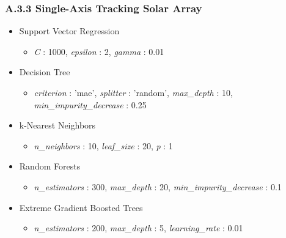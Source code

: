 \subsubsection*{A.3.3 \hspace{0.5em} Single-Axis Tracking Solar Array}
\begin{itemize}
    \item Support Vector Regression
    \begin{itemize}
        \item \textit{C} : 1000, \textit{epsilon} : 2,  \textit{gamma} : 0.01 
    \end{itemize}

    \item Decision Tree 
    \begin{itemize}
        \item \textit{criterion} : 'mae', \textit{splitter} : 'random', \textit{max\_depth} : 10, \textit{min\_impurity\_decrease} : 0.25 
    \end{itemize}

    \item k-Nearest Neighbors 
    \begin{itemize}
        \item \textit{n\_neighbors} : 10, \textit{leaf\_size} : 20, \textit{p} : 1
    \end{itemize}

    \item Random Forests 
    \begin{itemize}
        \item \textit{n\_estimators} : 300, \textit{max\_depth} : 20, \textit{min\_impurity\_decrease} : 0.1
    \end{itemize}

    \item Extreme Gradient Boosted Trees
    \begin{itemize}
        \item \textit{n\_estimators} : 200, \textit{max\_depth} : 5, \textit{learning\_rate} : 0.01 
    \end{itemize}

\end{itemize}

\newpage